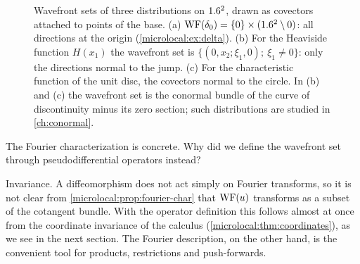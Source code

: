 \begin{figure}[htbp]
\centering
{}
\caption[Wavefront sets of three distributions on $\R^2$]{Wavefront sets of
three distributions on $\R^2$, drawn as covectors attached to points of the
base. (a) $\operatorname{WF}(\delta_0)=\{0\}\times(1.6^2\setminus0)$: all directions at the
origin (\cref{microlocal:ex:delta}). (b) For the Heaviside function
$H(x_1)$ the wavefront set is
$\{(0,x_2;\xi_1,0);\ \xi_1\ne0\}$: only the directions normal to the jump.
(c) For the characteristic function of the unit disc, the covectors normal
to the circle. In (b) and (c) the wavefront set is the conormal bundle of the
curve of discontinuity minus its zero section; such distributions are studied
in \cref{ch:conormal}.}
\label{microlocal:fig:wf-examples}
\end{figure}

\begin{question}
  The Fourier characterization is concrete. Why did we define the wavefront
  set through pseudodifferential operators instead?
\end{question}
\begin{answer}
  Invariance. A diffeomorphism does not act simply on Fourier transforms, so
  it is not clear from \cref{microlocal:prop:fourier-char} that $\operatorname{WF}(u)$
  transforms as a subset of the cotangent bundle. With the operator
  definition this follows almost at once from the coordinate invariance of
  the calculus (\cref{microlocal:thm:coordinates}), as we see in the next
  section. The Fourier description, on the other hand, is the convenient tool
  for products, restrictions and push-forwards.
\end{answer}

